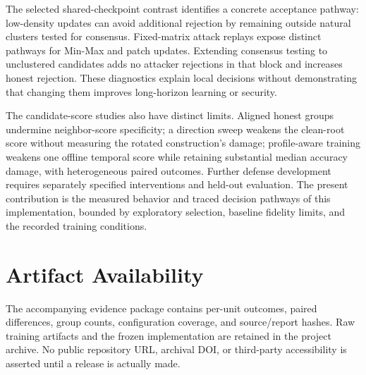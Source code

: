 \documentclass[journal]{IEEEtran}
\begin{document}
The selected shared-checkpoint contrast identifies a concrete acceptance pathway: low-density updates can avoid additional rejection by remaining outside natural clusters tested for consensus. Fixed-matrix attack replays expose distinct pathways for Min-Max and patch updates. Extending consensus testing to unclustered candidates adds no attacker rejections in that block and increases honest rejection. These diagnostics explain local decisions without demonstrating that changing them improves long-horizon learning or security.

The candidate-score studies also have distinct limits. Aligned honest groups undermine neighbor-score specificity; a direction sweep weakens the clean-root score without measuring the rotated construction's damage; profile-aware training weakens one offline temporal score while retaining substantial median accuracy damage, with heterogeneous paired outcomes. Further defense development requires separately specified interventions and held-out evaluation. The present contribution is the measured behavior and traced decision pathways of this implementation, bounded by exploratory selection, baseline fidelity limits, and the recorded training conditions.

\section*{Artifact Availability}
The accompanying evidence package contains per-unit outcomes, paired differences, group counts, configuration coverage, and source/report hashes. Raw training artifacts and the frozen implementation are retained in the project archive. No public repository URL, archival DOI, or third-party accessibility is asserted until a release is actually made.


\end{document}
